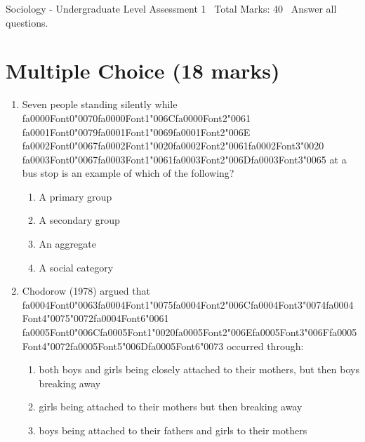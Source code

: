 \documentclass[12pt]{article}
\begin{document}
\begin{center}
Sociology - Undergraduate Level Assessment 1 \
Total Marks: 40 \
Answer all questions.
\end{center}

\section*{Multiple Choice (18 marks)}
\begin{enumerate}[label=\arabic*.]
\item Seven people standing silently while {\csname fa0000Font0\endcsname\char"0070}{\csname fa0000Font1\endcsname\char"006C}{\csname fa0000Font2\endcsname\char"0061} {\csname fa0001Font0\endcsname\char"0079}{\csname fa0001Font1\endcsname\char"0069}{\csname fa0001Font2\endcsname\char"006E} {\csname fa0002Font0\endcsname\char"0067}{\csname fa0002Font1\endcsname\char"0020}{\csname fa0002Font2\endcsname\char"0061}{\csname fa0002Font3\endcsname\char"0020} {\csname fa0003Font0\endcsname\char"0067}{\csname fa0003Font1\endcsname\char"0061}{\csname fa0003Font2\endcsname\char"006D}{\csname fa0003Font3\endcsname\char"0065} at a bus stop is an example of which of the following?
\begin{enumerate}[label=(\alph*)]
    \item A primary group
    \item A secondary group
    \item An aggregate
    \item A social category
\end{enumerate}
\item Chodorow (1978) argued that {\csname fa0004Font0\endcsname\char"0063}{\csname fa0004Font1\endcsname\char"0075}{\csname fa0004Font2\endcsname\char"006C}{\csname fa0004Font3\endcsname\char"0074}{\csname fa0004Font4\endcsname\char"0075}{\char"0072}{\csname fa0004Font6\endcsname\char"0061} {\csname fa0005Font0\endcsname\char"006C}{\csname fa0005Font1\endcsname\char"0020}{\csname fa0005Font2\endcsname\char"006E}{\csname fa0005Font3\endcsname\char"006F}{\csname fa0005Font4\endcsname\char"0072}{\csname fa0005Font5\endcsname\char"006D}{\csname fa0005Font6\endcsname\char"0073} occurred through:
\begin{enumerate}[label=(\alph*)]
    \item both boys and girls being closely attached to their mothers, but then boys breaking away
    \item girls being attached to their mothers but then breaking away
    \item boys being attached to their fathers and girls to their mothers

\end{enumerate}
\end{enumerate}
\end{document}
